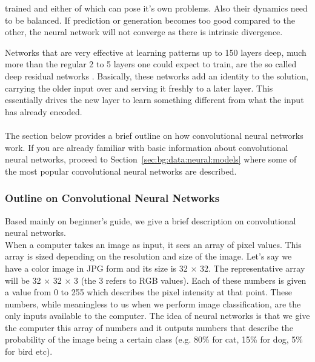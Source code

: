 \documentclass[12pt,a4paper,table,dvipsnames,tikz]{report}
\newcommand{\acronym}{\MakeUppercase}
\begin{document}
	trained and either of which can pose it’s own problems. Also their dynamics need 
	to be balanced. If prediction or generation becomes too good compared to the other, 
	the neural network will not converge as there is intrinsic divergence.
	\par
	Networks that are very effective at learning patterns up to 150 layers deep, much 
	more than the regular 2 to 5 layers one could expect to train, are the so called 
	deep residual networks \citep{He_resnet}. Basically, these networks add an identity 
	to the solution, carrying the older input over and serving it freshly to a later 
	layer. This essentially drives the new layer to learn something different from what 
	the input has already encoded. 
	\\\\
	
	The section below provides a brief outline on how convolutional neural networks 
	work. If you are already familiar with basic information about convolutional neural 
	networks, proceed to Section~\ref{sec:bg:data:neural:models} where some of the 
	most popular convolutional neural networks are described.
	\\
	
	\subsubsection{Outline on Convolutional Neural Networks}
	\label{sec:bg:data:neural:conv}
	
	Based mainly on \citet{Deshpande_guide} beginner's guide, we give a brief 
	description on convolutional neural networks.
	\\
	
	When a computer takes an image as input, it sees an array of pixel values. This 
	array is sized depending on the resolution and size of the image. Let's say we 
	have a color image in \acronym{jpg} form and its size is 32 $\times$ 32. The 
	representative array will be 32 $\times$ 32 $\times$ 3 (the 3 refers to \acronym{rgb} 
	values). Each of these numbers is given a value from 0 to 255 which describes the 
	pixel intensity at that point. These numbers, while meaningless to us when we 
	perform image classification, are the only inputs available to the computer. The 
	idea of neural networks is that we give the computer this array of numbers and 
	it outputs numbers that describe the probability of the image being a certain 
	class (e.g. 80\% for cat, 15\% for dog, 5\% for bird etc).
	\\
	
\end{document}
